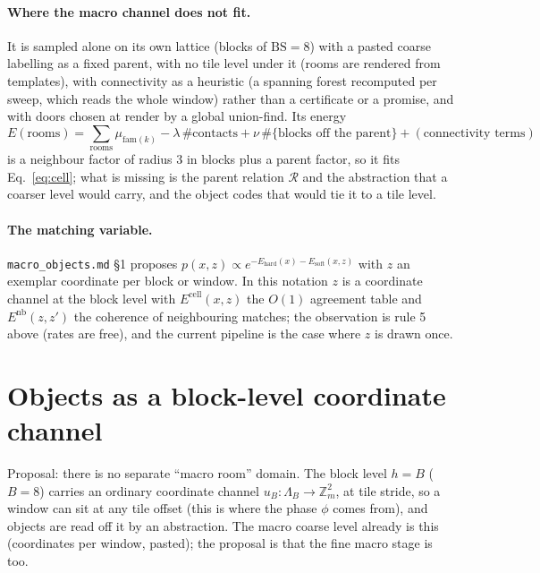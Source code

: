 \documentclass[11pt]{article}
\newcommand{\Z}{\mathbb{Z}}
\newcommand{\1}{\mathds{1}}
\newcommand{\refine}{\mathcal{R}}
\begin{document}
\paragraph{Where the macro channel does not fit.} It is sampled alone on its own
lattice (blocks of $\mathrm{BS} = 8$) with a pasted coarse labelling as a fixed
parent, with no tile level under it (rooms are rendered from templates), with
connectivity as a heuristic (a spanning forest recomputed per sweep, which reads
the whole window) rather than a certificate or a promise, and with doors chosen
at render by a global union-find. Its energy
\[
  E(\text{rooms}) = \sum_{\text{rooms}} \mu_{\mathrm{fam}(k)} - \lambda\, \#\text{contacts}
  + \nu\, \#\{\text{blocks off the parent}\} + (\text{connectivity terms})
\]
is a neighbour factor of radius 3 in blocks plus a parent factor, so it fits
Eq.~\eqref{eq:cell}; what is missing is the parent relation $\refine$ and the
abstraction that a coarser level would carry, and the object codes that would
tie it to a tile level.

\paragraph{The matching variable.} \texttt{macro\_objects.md} \S1 proposes
$p(x, z) \propto e^{-E_{\mathrm{hard}}(x) - E_{\mathrm{soft}}(x, z)}$ with $z$ an
exemplar coordinate per block or window. In this notation $z$ is a coordinate
channel at the block level with $E^{\mathrm{cell}}(x, z)$ the $O(1)$ agreement
table and $E^{\mathrm{nb}}(z, z')$ the coherence of neighbouring matches; the
observation is rule 5 above (rates are free), and the current pipeline is the
case where $z$ is drawn once.

\section{Objects as a block-level coordinate channel}
\label{sec:objects}

Proposal: there is no separate ``macro room'' domain. The block level $h = B$
($B = 8$) carries an ordinary coordinate channel $u_B : \Lambda_B \to \Z_m^2$,
at tile stride, so a window can sit at any tile offset (this is where the phase
$\phi$ comes from), and objects are read off it by an abstraction. The macro
coarse level already is this (coordinates per window, pasted); the proposal is
that the fine macro stage is too.
\end{document}
